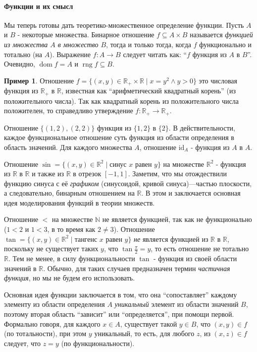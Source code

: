 \documentclass[12pt,notitlepage]{article}
\theoremstyle{plain}
\theoremstyle{definition}
\newtheorem{exm}[thm]{Пример}
\theoremstyle{plain}
\newcommand{\N}{\mathbb{N}}
\newcommand{\R}{\mathbb{R}}
\newcommand{\sbs}{\subseteq}
\newcommand{\dom}{\mathop{\mathrm{dom}}}
\newcommand{\rng}{\mathop{\mathrm{rng}}}
\newcommand{\id}{\mathrm{id}}
\newcommand{\1}{\mathbf{1}}
\newcommand{\0}{\mathbf{0}}
\begin{document}
\paragraph{Функции и их смысл} Мы теперь готовы дать теоретико-множественное определение функции. Пусть  $A$ и $B$ - некоторые множества. Бинарное отношение $f \sbs A \times B$ называется \emph{функцией из множества $A$ в множество $B$}, тогда и только тогда, когда $f$ функционально и тотально (на $A$). Выражение $f\colon A \to B$ следует читать как: ``$f$ функция из $A$ в $B$''. Очевидно, $\dom f = A$ и $\rng f \sbs B$.

\begin{exm}
	Отношение $f = \{(x,y) \in \R_+ \times \R \mid x = y^2 \wedge y > 0 \}$ это числовая функция из $\R_+$ в $\R$, известная как ``арифметический квадратный корень'' (из положительного числа). Так как квадратный корень из положительного числа положителен, то справедливо утверждение $f\colon \R_+ \to \R_+$.
	
	Отношение $\{ (1,2), (2,2) \}$ функция из $\{1, 2\}$ в $\{2\}$. В действительности, каждое функциональное отношение суть функция из области определения в область значений. Для каждого множества $A$, отношение $\id_A$ - функция из $A$ в $A$.
	
	Отношение $\sin = \{ (x, y) \in \R^2 \mid \mbox{синус $x$ равен $y$} \}$ на множестве $\R^2$ - функция из $\R$ в $\R$ и также из $\R$ в отрезок $[-1, 1]$. Заметим, что мы отождествили функцию синуса с её \emph{графиком} (синусоидой, кривой синуса)---частью плоскости, а следовательно, бинарным отношением на $\R$. В этом и заключается основная идея моделирования функций в теории множеств.
	
	Отношение $<$ на множестве $\N$ не является функцией, так как не функционально ($1 < 2$ и $1 < 3$, в то время как $2 \neq 3$). Отношение $\tan = \{ (x, y) \in \R^2 \mid \mbox{тангенс $x$ равен $y$} \}$ \emph{не} является функцией из $\R$ в $\R$, поскольку не существует таких $y$, что $\tan \frac{\pi}{2} = y$, то есть отношение не тотально $\R$. Тем не менее, в силу функциональности $\tan$ - функция из своей области значений в $\R$. Обычно, для таких случаев предназначен термин \emph{частичная функция}, но мы не будем его использовать.
\end{exm}

Основная идея функции заключается в том, что  она ``сопоставляет'' каждому элементу из области определения $A$ \emph{уникальный} элемент из области значений $B$, поэтому вторая область ``зависит'' или ``определяется'', при помощи первой. Формально говоря, для каждого $x \in A$, существует такой $y \in B$, что $(x,y) \in f$ (по тотальности), при этом $y$ уникальный, то есть, для любого $z$, из $(x,z) \in f$ следует, что $z = y$ (по функциональности).
\end{document}
